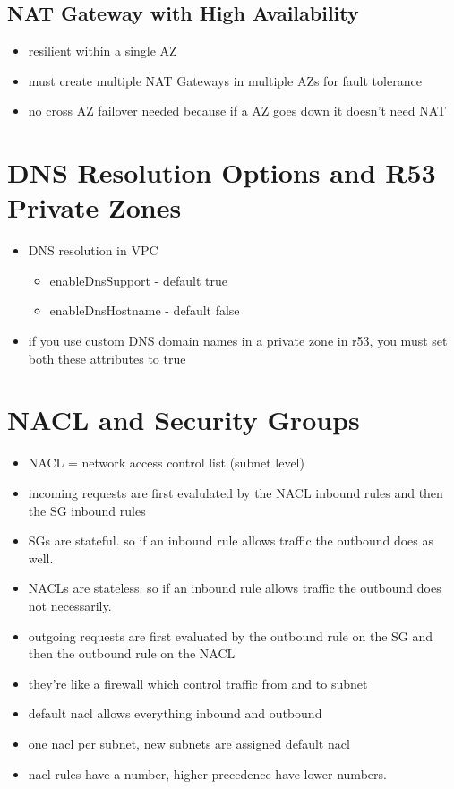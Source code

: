 \documentclass[]{scrartcl}
\begin{document}
\subsection{NAT Gateway with High Availability}
\begin{itemize}
	\item resilient within a single AZ
	\item must create multiple NAT Gateways in multiple AZs for fault tolerance
	\item no cross AZ failover needed because if a AZ goes down it doesn't need NAT
\end{itemize}

\section{DNS Resolution Options and R53 Private Zones}
\begin{itemize}
	\item DNS resolution in VPC
	\begin{itemize}
		\item enableDnsSupport - default true
		\item enableDnsHostname - default false
	\end{itemize}
	\item if you use custom DNS domain names in a private zone in r53, you must set both these attributes to true
\end{itemize}

\section{NACL and Security Groups}
\begin{itemize}
	\item NACL = network access control list (subnet level)
	\item incoming requests are first evalulated by the NACL inbound rules and then the SG inbound rules
	\item SGs are stateful. so if an inbound rule allows traffic the outbound does as well.
	\item NACLs are stateless. so if an inbound rule allows traffic the outbound does not necessarily. 
	\item outgoing requests are first evaluated by the outbound rule on the SG and then the outbound rule on the NACL
	\item they're like a firewall which control traffic from and to subnet
	\item default nacl allows everything inbound and outbound
	\item one nacl per subnet, new subnets are assigned default nacl
	\item nacl rules have a number, higher precedence have lower numbers. 
\end{itemize}
\end{document}
